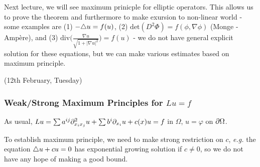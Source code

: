 \documentclass[12pt,a4paper]{article}
\begin{document}
Next lecture, we will see maximum prinicple for elliptic operators. This allows us to prove the theorem and furthermore to make exursion to non-linear world - some examples are (1) $-\triangle u = f(u)$, (2) $\text{det}(D^2 \Phi) = f(\phi, \nabla \phi)$ (Monge -Amp\`{e}re), and (3) $\text{div}\Big( \frac{\nabla u}{\sqrt{1+ |\nabla u|^2}} \Big) = f(u)$ - we do not have general explicit solution for these equations, but we can make various estimates based on maximum principle.
\s

\newday

(12th February, Tuesday)
\s

\subsubsection*{Weak/Strong Maximum Principles for $Lu =f$}

As usual, $Lu = \sum a^{ij}\partial^2_{x_i x_j} u + \sum b^i \partial_{x_i} u + c(x) u = f$ in $\Omega$, $u=\varphi$ on $\partial \Omega$.
\s

To establish maximum principle, we need to make strong restriction on $c$, \textit{e.g.} the equation $\triangle u + cu =0$ has exponential growing solution if $c\neq 0$, so we do not have any hope of making a good bound. 
\s
\end{document}
